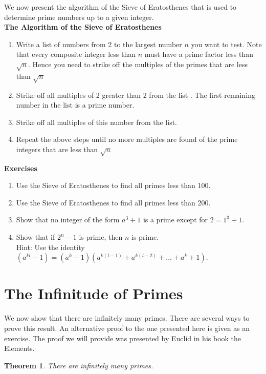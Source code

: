 \documentclass[12pt,letterpaper]{book}
\newtheorem{theorem}{Theorem}
\begin{document}
We now present the algorithm of the Sieve of Eratosthenes that is
used to determine prime numbers up to a given integer.\\

\textbf{The Algorithm of the Sieve of Eratosthenes}
\begin{enumerate}
\item{Write a list of numbers from 2 to the largest number $n$ you
want to test. Note that every composite integer less than $n$ must
have a prime factor less than $\sqrt{n}$. Hence you need to strike
off the multiples of the primes that are less than $\sqrt{n}$}
 \item{Strike off all multiples of 2 greater than 2 from the list . The first remaining number
in the list is a prime number.} \item{Strike off all multiples of
this number from the list.} \item{Repeat the above steps until no
more multiples are found of the prime integers that are less than
$\sqrt{n}$}
\end{enumerate}

\textbf{Exercises}
\begin{enumerate}
\item{Use the Sieve of Eratosthenes to find all primes less than
100.} \item{Use the Sieve of Eratosthenes to find all primes less
than 200.}\item{Show that no integer of the form $a^3+1$ is a prime
except for $2=1^3+1$.}\item{Show that if $2^n-1$ is prime, then $n$
is prime.  \\Hint: Use the identity
$(a^{kl}-1)=(a^{k}-1)(a^{k(l-1)}+a^{k(l-2)}+...+a^k+1)$}.
\end{enumerate}

\newpage

\section{The Infinitude of Primes}
We now show that there are infinitely many primes.  There are
several ways to prove this result.  An alternative proof to the one
presented here is given as an exercise.  The proof we will provide
was presented by Euclid in his book the Elements.

\begin{theorem}
There are infinitely many primes.
\end{theorem}
\end{document}
